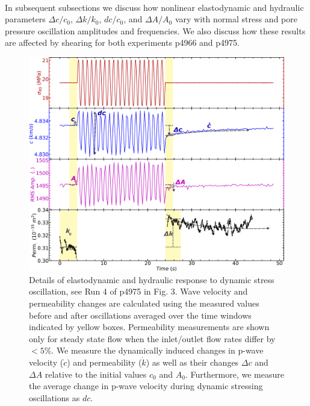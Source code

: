 \documentclass[letterpaper,10pt]{article}
\begin{document}
	
	\paragraph{}
	In subsequent subsections we discuss how nonlinear elastodynamic and hydraulic parameters $\Delta c/c_0$, $ \Delta k/k_0 $, $dc/c_0$, and $\Delta A/A_0$ vary with normal stress and pore pressure oscillation amplitudes and frequencies. We also discuss how these results are affected by shearing for both experiments p4966 and p4975.
	
	\newpage
	
	\begin{figure}[ht]
		\centering
		\includegraphics[width=0.9\columnwidth]{NsVelRmsPerm_v2_edit}
		\caption[]{Details of elastodynamic and hydraulic response to dynamic stress oscillation, see Run 4 of p4975 in Fig. 3. Wave velocity and permeability changes are calculated using the measured values before and after oscillations averaged over the time windows indicated by yellow boxes. Permeability measurements are shown only for steady state flow when the inlet/outlet flow rates differ by $ < 5 \% $. We measure the dynamically induced changes in p-wave velocity ($ \dot c$) and permeability ($\dot k$) as well as their changes $\Delta c$ and $\Delta A$ relative to the initial values $c_0$ and $A_0$. Furthermore, we measure the average change in p-wave velocity during dynamic stressing oscillations as $ dc $.}
		\label{fig:delc_delk_calc}
	\end{figure}
	
\end{document}
